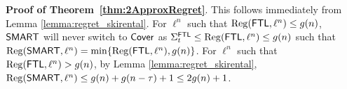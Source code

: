 
{\bf Proof of Theorem~\ref{thm:2ApproxRegret}}. 
This follows immediately from Lemma \ref{lemma:regret_skirental}. For $\ell^n$ such that $\mathrm{Reg}(\mathsf{FTL},\ell^n) \le g(n)$, $\mathsf{SMART}$ will never switch to $\mathsf{Cover}$ as $\Sigma^{\mathsf{FTL}}_t \le \mathrm{Reg}(\mathsf{FTL}, \ell^n) \leq g(n)$ such that $\mathrm{Reg}(\mathsf{SMART},\ell^n) = \min\{\mathrm{Reg}(\mathsf{FTL}, \ell^n), g(n)\}$. For $\ell^n$ such that $\mathrm{Reg}(\mathsf{FTL},\ell^n) > g(n)$, by Lemma \ref{lemma:regret_skirental}, $\mathrm{Reg}(\mathsf{SMART}, \ell^n)\leq g(n) + g(n-\tau) +1 \leq 2 g(n) +1$. \\%

